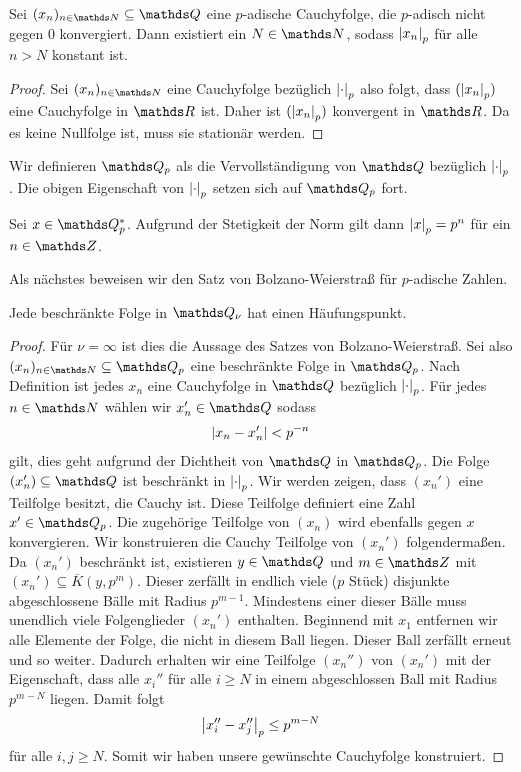 \begin{satz}
Sei $(x_n)_{n \in \N} \subseteq \Q$ eine $p$-adische Cauchyfolge, die $p$-adisch nicht gegen $0$ konvergiert.
Dann existiert ein $N \in \N$, sodass $\left\vert x_n\right\vert_p$ für alle $n>N$ konstant ist.
\begin{proof}
Sei $(x_n)_{n\in \N}$ eine Cauchyfolge bezüglich $\left\vert\cdot\right\vert_p$ also folgt, dass $(\left\vert x_n\right\vert_p)$ eine Cauchyfolge in $\R$ ist.
Daher ist $(\left\vert x_n\right\vert_p)$ konvergent in $\R$. Da es keine Nullfolge ist, muss sie stationär werden.
\end{proof}
\end{satz}

\begin{defi}
Wir definieren $\Q_p$ als die Vervollständigung von $\Q$ bezüglich $\left\vert\cdot\right\vert_p$.
Die obigen Eigenschaft von $\left\vert\cdot\right\vert_p$ setzen sich auf $\Q_p$ fort.
\end{defi}

\begin{bsp}
Sei $x\in \Q_p^\ast$. Aufgrund der Stetigkeit der Norm gilt dann $\left\vert x\right\vert_p=p^n$ für ein $n\in \Z$.
\end{bsp}
Als nächstes beweisen wir den Satz von Bolzano-Weierstraß für $p$-adische Zahlen.

\begin{thm}
Jede beschränkte Folge in $\Q_\nu$ hat einen Häufungspunkt.
\begin{proof}
Für $\nu=\infty$ ist dies die Aussage des Satzes von Bolzano-Weierstraß.
Sei also $(x_n)_{n\in \N} \subseteq \Q_p$ eine beschränkte Folge in $\Q_p$.
Nach Definition ist jedes $x_n$ eine Cauchyfolge in $\Q$ bezüglich $\left\vert\cdot\right\vert_p$.
Für jedes $n \in \N$ wählen wir $x_n' \in \Q$ sodass
\begin{align*}
\left\vert x_n-x_n'\right\vert<p^{-n}
\end{align*}
gilt, dies geht aufgrund der Dichtheit von $\Q$ in $\Q_p$.
Die Folge $(x_n')\subseteq \Q$ ist beschränkt in $\left\vert\cdot\right\vert_p$.
Wir werden zeigen, dass $(x_n')$ eine Teilfolge besitzt, die Cauchy ist.
Diese Teilfolge definiert eine Zahl $x'\in \Q_p$.
Die zugehörige Teilfolge von $(x_n)$ wird ebenfalls gegen $x$ konvergieren.
Wir konstruieren die Cauchy Teilfolge von $(x_n')$ folgendermaßen.
Da $(x_n')$ beschränkt ist, existieren $y \in \Q$ und $m\in \Z$ mit $(x_n')\subseteq \overline{K}(y,p^m)$. Dieser zerfällt in endlich viele ($p$ Stück) disjunkte abgeschlossene Bälle mit Radius $p^{m-1}$.
Mindestens einer dieser Bälle muss unendlich viele Folgenglieder $(x_n')$ enthalten.
Beginnend mit $x_1$ entfernen wir alle Elemente der Folge, die nicht in diesem Ball liegen.
Dieser Ball zerfällt erneut und so weiter.
Dadurch erhalten wir eine Teilfolge $(x_n'')$ von $(x_n')$ mit der Eigenschaft,
dass alle $x_i''$ für alle $i\geq N$ in einem abgeschlossen Ball
mit Radius $p^{m-N}$ liegen. Damit folgt
\begin{align*}
\left\vert x_i''-x_j''\right\vert_p\leq p^{m-N}
\end{align*}
für alle $i,j\geq N$. Somit wir haben unsere gewünschte Cauchyfolge konstruiert.
\end{proof}
\end{thm}


